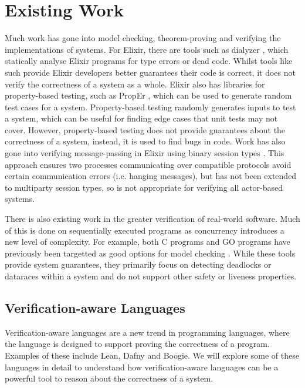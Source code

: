 \section{Existing Work}
Much work has gone into model checking, theorem-proving and verifying the implementations of systems. For Elixir, there are tools such as dialyzer \cite{dialyzer}, which statically analyse Elixir programs for type errors or dead code. Whilst tools like such provide Elixir developers better guarantees their code is correct, it does not verify the correctness of a system as a whole. Elixir also has libraries for property-based testing, such as PropEr \cite{proper}, which can be used to generate random test cases for a system. Property-based testing randomly generates inputs to test a system, which can be useful for finding edge cases that unit tests may not cover. However, property-based testing does not provide guarantees about the correctness of a system, instead, it is used to find bugs in code. Work has also gone into verifying message-passing in Elixir using binary session types \cite{binary_session_types}. This approach ensures two processes communicating over compatible protocols avoid certain communication errors (i.e. hanging messages), but has not been extended to multiparty session types, so is not appropriate for verifying all actor-based systems.
\par
There is also existing work in the greater verification of real-world software. Much of this is done on sequentially executed programs as concurrency introduces a new level of complexity. For example, both C programs and GO programs have previously been targetted as good options for model checking \cite{gomela, c_to_promela}. While these tools provide system guarantees, they primarily focus on detecting deadlocks or dataraces within a system and do not support other safety or liveness properties.  
\subsection{Verification-aware Languages}
Verification-aware languages are a new trend in programming languages, where the language is designed to support proving the correctness of a program. Examples of these include Lean, Dafny and Boogie. We will explore some of these languages in detail to understand how verification-aware languages can be a powerful tool to reason about the correctness of a system.
